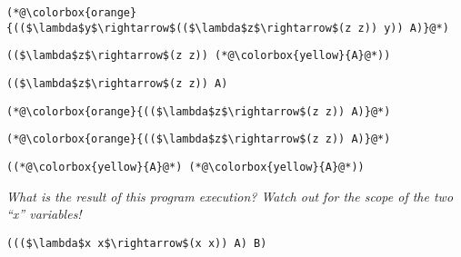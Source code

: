 \documentclass{beamer}
\begin{document}
\begin{frame}[fragile]{\CurrentSection}
\lstset{basicstyle=\ttfamily\small}\lstset{numbers=none}\lstset{language=ML}\begin{lstlisting}
(*@\colorbox{orange}{(($\lambda$y$\rightarrow$(($\lambda$z$\rightarrow$(z z)) y)) A)}@*)
\end{lstlisting}
\pause\lstset{language=ML}\begin{lstlisting}
(($\lambda$z$\rightarrow$(z z)) (*@\colorbox{yellow}{A}@*))
\end{lstlisting}

\end{frame}

\begin{frame}[fragile]{\CurrentSection}
\lstset{basicstyle=\ttfamily\small}\lstset{numbers=none}\lstset{language=ML}\begin{lstlisting}
(($\lambda$z$\rightarrow$(z z)) A)
\end{lstlisting}
\pause\lstset{language=ML}\begin{lstlisting}
(*@\colorbox{orange}{(($\lambda$z$\rightarrow$(z z)) A)}@*)
\end{lstlisting}

\end{frame}

\begin{frame}[fragile]{\CurrentSection}
\lstset{basicstyle=\ttfamily\small}\lstset{numbers=none}\lstset{language=ML}\begin{lstlisting}
(*@\colorbox{orange}{(($\lambda$z$\rightarrow$(z z)) A)}@*)
\end{lstlisting}
\pause\lstset{language=ML}\begin{lstlisting}
((*@\colorbox{yellow}{A}@*) (*@\colorbox{yellow}{A}@*))
\end{lstlisting}

\end{frame}

\begin{frame}[fragile]{\CurrentSection}
\begin{exampleblock}{}
\textit{What is the result of this program execution? Watch out for the scope of the two ``x'' variables!}
\end{exampleblock}

 
\lstset{basicstyle=\ttfamily\small}\lstset{numbers=none}\lstset{language=ML}\begin{lstlisting}
((($\lambda$x x$\rightarrow$(x x)) A) B)
\end{lstlisting}
 

\end{frame}
\end{document}
